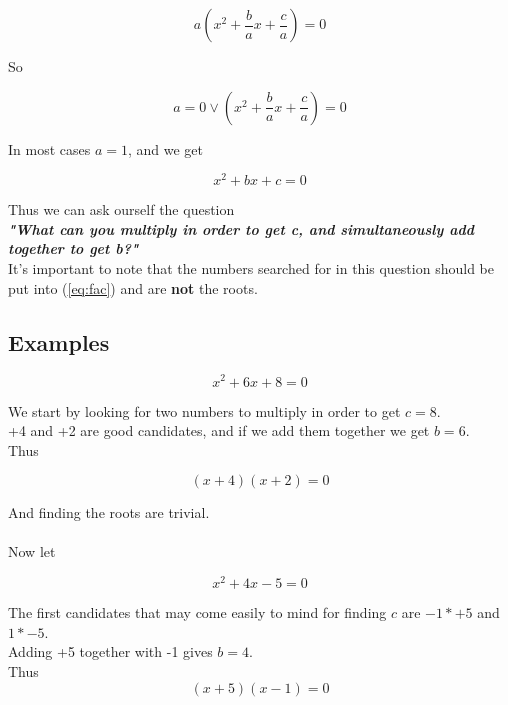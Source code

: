 \documentclass[a4paper]{article}
\begin{document}
\begin{equation}  \label{eq:facto}
	a(x^2 + \frac{b}{a}x + \frac{c}{a}) = 0
\end{equation}

So

\begin{equation}  \label{eq:factor}
	a = 0 \vee (x^2 + \frac{b}{a}x + \frac{c}{a}) = 0
\end{equation}

In most cases $a=1$, and we get

\begin{equation}  \label{eq:poly}
	x^2 + bx + c = 0
\end{equation}

Thus we can ask ourself the question\\ \newline \emph{\textbf{"What can you multiply in order to get c, and simultaneously add together to get b?"}}\\

It's important to note that the numbers searched for in this question should be put into (\ref{eq:fac}) and are \textbf{not} the roots.




\newpage

\subsection{Examples}

\begin{equation}  \label{eq:ex1}
	x^2 + 6x + 8 = 0
\end{equation}

We start by looking for two numbers to multiply in order to get $c=8$.\\ +4 and +2 are good candidates, and if we add them together we get $b=6$.\\ Thus

\begin{equation} \label{eq:ex11}
 (x+4)(x+2) = 0
\end{equation}

And finding the roots are trivial.\\ \\
Now let

\begin{equation}  \label{eq:ex2}
	x^2 + 4x - 5  = 0
\end{equation}

The first candidates that may come easily to mind for finding $c$ are $-1*+5$ and $1*-5$.\\ Adding +5 together with -1 gives $b=4$. \\ Thus
\begin{equation} \label{eq:ex21}
 (x+5)(x-1) = 0
\end{equation}
\end{document}
